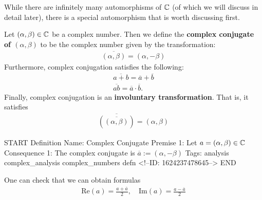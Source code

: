 \documentclass{memoir}
\begin{document}
While there are infinitely many automorphisms of \(\mathbb{C}\) (of which we will discuss in detail later), there is a special automorphism that is worth discussing first.\\

\begin{defn}
	Let \((\alpha ,\beta ) \in \mathbb{C}\) be a complex number. Then we define the \textbf{complex conjugate of \((\alpha ,\beta )\)} to be the complex number given by the transformation:
	\begin{align*}
		\overline{(\alpha ,\beta )} = (\alpha ,-\beta )
	\end{align*}
	Furthermore, complex conjugation satisfies the following:
	\begin{align*}
		\overline{a+b} = \overline{a} + \overline{b}\\
		\overline{ab} = \overline{a}\cdot \overline{b}.
	\end{align*}
	Finally, complex conjugation is an \textbf{involuntary transformation}. That is, it satisfies
	\begin{align*}
		\overline{ \left( \overline{(\alpha ,\beta )} \right) } = (\alpha ,\beta )
	\end{align*}
\end{defn}
\begin{anki}
START
Definition
Name: Complex Conjugate
Premise 1: Let \(a = (\alpha ,\beta ) \in \mathbb{C}\)
Consequence 1: The complex conjugate is \(\overline{a} := (\alpha ,-\beta )\)
Tags: analysis complex_analysis complex_numbers defn 
<!--ID: 1624237478645-->
END
\end{anki}

One can check that we can obtain formulas
\begin{align*}
	\textrm{Re}(a) = \frac{a + \overline{a}}{2}, \quad \textrm{Im}(a) = \frac{a - \overline{a}}{2}
\end{align*}
\end{document}

